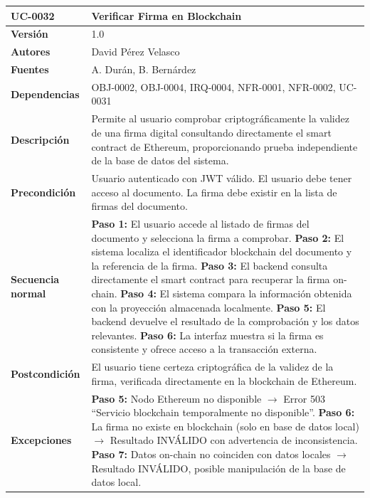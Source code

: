 \documentclass[11pt, a4paper]{article}
\begin{document}
\begin{longtable}{|p{4cm}|p{10cm}|}
\hline
\textbf{UC-0032} & Verificar Firma en Blockchain \\
\hline
\textbf{Versión} & 1.0 \\
\hline
\textbf{Autores} & David Pérez Velasco \\
\hline
\textbf{Fuentes} & A. Durán, B. Bernárdez \\
\hline
\textbf{Dependencias} & OBJ-0002, OBJ-0004, IRQ-0004, NFR-0001, NFR-0002, UC-0031 \\
\hline
\textbf{Descripción} & Permite al usuario comprobar criptográficamente la validez de una firma digital consultando directamente el smart contract de Ethereum, proporcionando prueba independiente de la base de datos del sistema. \\
\hline
\textbf{Precondición} & Usuario autenticado con JWT válido. El usuario debe tener acceso al documento. La firma debe existir en la lista de firmas del documento. \\
\hline
\textbf{Secuencia normal} &
\textbf{Paso 1:} El usuario accede al listado de firmas del documento y selecciona la firma a comprobar.\newline
\textbf{Paso 2:} El sistema localiza el identificador blockchain del documento y la referencia de la firma.\newline
\textbf{Paso 3:} El backend consulta directamente el smart contract para recuperar la firma on-chain.\newline
\textbf{Paso 4:} El sistema compara la información obtenida con la proyección almacenada localmente.\newline
\textbf{Paso 5:} El backend devuelve el resultado de la comprobación y los datos relevantes.\newline
\textbf{Paso 6:} La interfaz muestra si la firma es consistente y ofrece acceso a la transacción externa.\\
\hline
\textbf{Postcondición} & El usuario tiene certeza criptográfica de la validez de la firma, verificada directamente en la blockchain de Ethereum. \\
\hline
\textbf{Excepciones} &
\textbf{Paso 5:} Nodo Ethereum no disponible $\rightarrow$ Error 503 ``Servicio blockchain temporalmente no disponible''.\newline
\textbf{Paso 6:} La firma no existe en blockchain (solo en base de datos local) $\rightarrow$ Resultado INVÁLIDO con advertencia de inconsistencia.\newline
\textbf{Paso 7:} Datos on-chain no coinciden con datos locales $\rightarrow$ Resultado INVÁLIDO, posible manipulación de la base de datos local.\\

\end{longtable}
\end{document}
